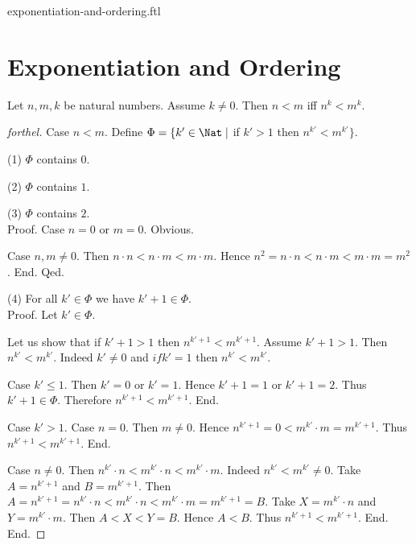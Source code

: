 \documentclass{naproche-library}
\begin{document}
\begin{smodule}{exponentiation-and-ordering.ftl}

  \section*{Exponentiation and Ordering}

  \begin{proposition}[forthel,id=ARITHMETIC_09_3373702288769024]
    Let $n, m, k$ be natural numbers.
    Assume $k \neq 0$.
    Then $n < m$ iff $n^{k} < m^{k}$.
  \end{proposition}
  \begin{proof}[forthel]
    Case $n < m$.
      Define $\Phi = \{ k' \in \Nat \mid$ if $k' > 1$ then $n^{k'} < m^{k'} \}$.

      (1) $\Phi$ contains $0$.

      (2) $\Phi$ contains $1$.

      (3) $\Phi$ contains $2$. \\
      Proof.
        Case $n = 0$ or $m = 0$. Obvious.

        Case $n, m \neq 0$.
          Then $n \cdot n
            < n \cdot m
            < m \cdot m$.
          Hence $n^{2}
            = n \cdot n
            < n \cdot m
            < m \cdot m
            = m^{2}$.
        End.
      Qed.

      (4) For all $k' \in \Phi$ we have $k' + 1 \in \Phi$. \\
      Proof.
        Let $k' \in \Phi$.

        Let us show that if $k' + 1 > 1$ then $n^{k' + 1} < m^{k' + 1}$.
          Assume $k' + 1 > 1$.
          Then $n^{k'} < m^{k'}$.
          Indeed $k' \neq 0$ and $if k' = 1$ then $n^{k'} < m^{k'}$.

          Case $k' \leq 1$.
            Then $k' = 0$ or $k' = 1$.
            Hence $k' + 1 = 1$ or $k' + 1 = 2$.
            Thus $k' + 1 \in \Phi$.
            Therefore $n^{k' + 1} < m^{k' + 1}$.
          End.

          Case $k' > 1$.
            Case $n = 0$.
              Then $m \neq 0$.
              Hence $n^{k' + 1}
                = 0
                < m^{k'} \cdot m
                = m^{k' + 1}$.
              Thus $n^{k' + 1} < m^{k' + 1}$.
            End.

            Case $n \neq 0$.
              Then $n^{k'} \cdot n
                < m^{k'} \cdot n
                < m^{k'} \cdot m$.
              Indeed $n^{k'} < m^{k'} \neq 0$.
              Take $A = n^{k' + 1}$ and $B = m^{k' + 1}$. %
              Then $A
                = n^{k' + 1}
                = n^{k'} \cdot n
                < m^{k'} \cdot n
                < m^{k'} \cdot m
                = m^{k' + 1}
                = B$.
              Take $X = m^{k'} \cdot n$ and $Y = m^{k'} \cdot m$.
              Then $A < X < Y = B$.
              Hence $A < B$.
              Thus $n^{k' + 1} < m^{k' + 1}$.
            End.
          End.


\end{proof}
\end{smodule}
\end{document}
